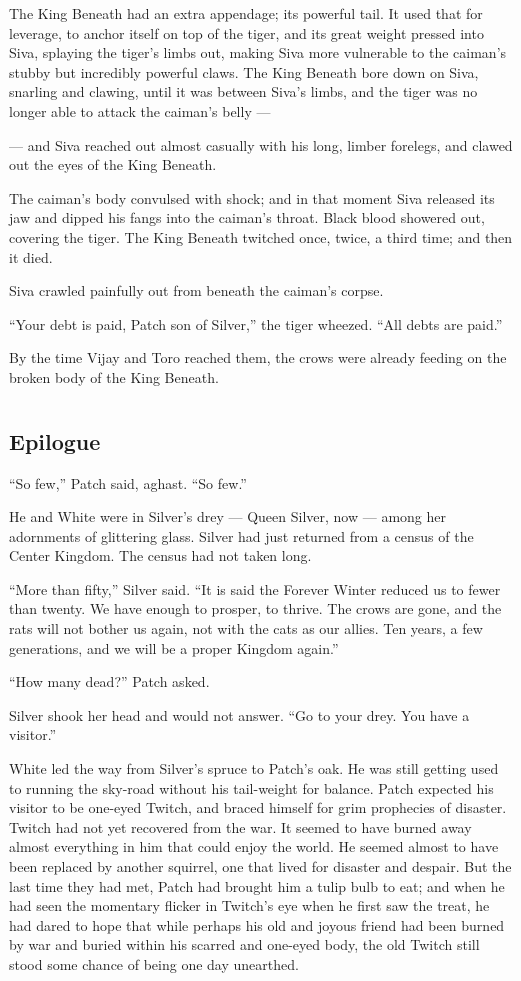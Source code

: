 \documentclass[ebook,oneside,openany,17pt]{memoir}
\renewcommand{\thechapter}{\Roman{chapter}}
\newcounter{sections}
\newcommand{\sections}[1]{%
  \section*{#1}
  \addtocounter{sections}{1}%
  \pdfbookmark[1]{#1}{section.\thechapter.\thesections}}
\begin{document}
The King Beneath had an extra appendage; its powerful tail. It used
that for leverage, to anchor itself on top of the tiger, and its great
weight pressed into Siva, splaying the tiger’s limbs out, making Siva
more vulnerable to the caiman’s stubby but incredibly powerful
claws. The King Beneath bore down on Siva, snarling and clawing, until
it was between Siva’s limbs, and the tiger was no longer able to
attack the caiman’s belly —

— and Siva reached out almost casually with his long, limber forelegs,
and clawed out the eyes of the King Beneath.

The caiman’s body convulsed with shock; and in that moment Siva
released its jaw and dipped his fangs into the caiman’s throat. Black
blood showered out, covering the tiger. The King Beneath twitched
once, twice, a third time; and then it died.

Siva crawled painfully out from beneath the caiman’s corpse.

“Your debt is paid, Patch son of Silver,” the tiger wheezed. “All
debts are paid.”

By the time Vijay and Toro reached them, the crows were already
feeding on the broken body of the King Beneath.


\chapter{}

\sections{Epilogue}

“So few,” Patch said, aghast. “So few.”

He and White were in Silver’s drey — Queen Silver, now — among her
adornments of glittering glass. Silver had just returned from a census
of the Center Kingdom. The census had not taken long.

“More than fifty,” Silver said. “It is said the Forever Winter reduced
us to fewer than twenty. We have enough to prosper, to thrive. The
crows are gone, and the rats will not bother us again, not with the
cats as our allies. Ten years, a few generations, and we will be a
proper Kingdom again.”

“How many dead?” Patch asked.

Silver shook her head and would not answer. “Go to your drey. You have
a visitor.”

White led the way from Silver’s spruce to Patch’s oak. He was still
getting used to running the sky-road without his tail-weight for
balance. Patch expected his visitor to be one-eyed Twitch, and braced
himself for grim prophecies of disaster. Twitch had not yet recovered
from the war. It seemed to have burned away almost everything in him
that could enjoy the world. He seemed almost to have been replaced by
another squirrel, one that lived for disaster and despair. But the
last time they had met, Patch had brought him a tulip bulb to eat; and
when he had seen the momentary flicker in Twitch’s eye when he first
saw the treat, he had dared to hope that while perhaps his old and
joyous friend had been burned by war and buried within his scarred and
one-eyed body, the old Twitch still stood some chance of being one day
unearthed.
\end{document}
